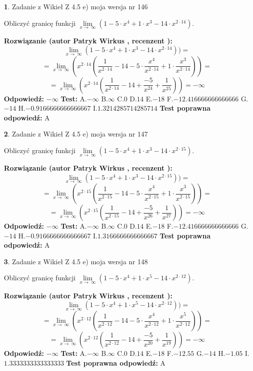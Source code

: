 \documentclass[12pt, a4paper]{article}
\theoremstyle{definition} %
\newtheorem{zad}{}
\newcommand{\zadStart}[1]{\begin{zad}#1\newline}
\newcommand{\zadStop}{\end{zad}}
\newcommand{\rozwStart}[2]{\noindent \textbf{Rozwiązanie (autor #1 , recenzent #2): }\newline}
\newcommand{\rozwStop}{\newline}
\newcommand{\odpStart}{\noindent \textbf{Odpowiedź:}\newline}
\newcommand{\odpStop}{\newline}
\newcommand{\testStart}{\noindent \textbf{Test:}\newline}
\newcommand{\testStop}{\newline}
\newcommand{\kluczStart}{\noindent \textbf{Test poprawna odpowiedź:}\newline}
\newcommand{\kluczStop}{\newline}
\begin{document}
\zadStart{Zadanie z Wikieł Z 4.5 e) moja wersja nr 146}


Obliczyć granicę funkcji  $\lim\limits_{x\to\ \infty}(1 - 5 \cdot x^{4}+1 \cdot x^{3}- 14 \cdot x^{2\cdot14})$.
\zadStop
\rozwStart{Patryk Wirkus}{}
$$\lim\limits_{x\to\ \infty}(1 - 5 \cdot x^{4}+1 \cdot x^{3}- 14 \cdot x^{2\cdot14}))=$$
$$=\lim\limits_{x\to\ \infty}(x^{2\cdot14}(\frac{1}{x^{2\cdot14}}-14 -5 \cdot \frac{x^{4}}{x^{2\cdot14}}+1 \cdot \frac{x^{3}}{x^{2\cdot14}}))=$$
$$=\lim\limits_{x\to\ \infty}(x^{2\cdot14}(\frac{1}{x^{2\cdot14}}-14 + \frac{-5}{x^{24}}+ \frac{1}{x^{25}}))=-\infty$$
\rozwStop
\odpStart
$-\infty$
\odpStop
\testStart
A.$-\infty$ B.$\infty$ C.$0$ D.$14$ E.$-18$
F.$-12.416666666666666$ G.$-14$
H.$-0.9166666666666667$
I.$1.3214285714285714$
\testStop
\kluczStart
A
\kluczStop



\zadStart{Zadanie z Wikieł Z 4.5 e) moja wersja nr 147}


Obliczyć granicę funkcji  $\lim\limits_{x\to\ \infty}(1 - 5 \cdot x^{4}+1 \cdot x^{3}- 14 \cdot x^{2\cdot15})$.
\zadStop
\rozwStart{Patryk Wirkus}{}
$$\lim\limits_{x\to\ \infty}(1 - 5 \cdot x^{4}+1 \cdot x^{3}- 14 \cdot x^{2\cdot15}))=$$
$$=\lim\limits_{x\to\ \infty}(x^{2\cdot15}(\frac{1}{x^{2\cdot15}}-14 -5 \cdot \frac{x^{4}}{x^{2\cdot15}}+1 \cdot \frac{x^{3}}{x^{2\cdot15}}))=$$
$$=\lim\limits_{x\to\ \infty}(x^{2\cdot15}(\frac{1}{x^{2\cdot15}}-14 + \frac{-5}{x^{26}}+ \frac{1}{x^{27}}))=-\infty$$
\rozwStop
\odpStart
$-\infty$
\odpStop
\testStart
A.$-\infty$ B.$\infty$ C.$0$ D.$14$ E.$-18$
F.$-12.416666666666666$ G.$-14$
H.$-0.9166666666666667$
I.$1.3166666666666667$
\testStop
\kluczStart
A
\kluczStop



\zadStart{Zadanie z Wikieł Z 4.5 e) moja wersja nr 148}


Obliczyć granicę funkcji  $\lim\limits_{x\to\ \infty}(1 - 5 \cdot x^{4}+1 \cdot x^{5}- 14 \cdot x^{2\cdot12})$.
\zadStop
\rozwStart{Patryk Wirkus}{}
$$\lim\limits_{x\to\ \infty}(1 - 5 \cdot x^{4}+1 \cdot x^{5}- 14 \cdot x^{2\cdot12}))=$$
$$=\lim\limits_{x\to\ \infty}(x^{2\cdot12}(\frac{1}{x^{2\cdot12}}-14 -5 \cdot \frac{x^{4}}{x^{2\cdot12}}+1 \cdot \frac{x^{5}}{x^{2\cdot12}}))=$$
$$=\lim\limits_{x\to\ \infty}(x^{2\cdot12}(\frac{1}{x^{2\cdot12}}-14 + \frac{-5}{x^{20}}+ \frac{1}{x^{19}}))=-\infty$$
\rozwStop
\odpStart
$-\infty$
\odpStop
\testStart
A.$-\infty$ B.$\infty$ C.$0$ D.$14$ E.$-18$
F.$-12.55$ G.$-14$
H.$-1.05$
I.$1.3333333333333333$
\testStop
\kluczStart
A
\kluczStop
\end{document}
